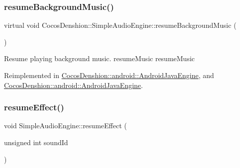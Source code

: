 \mbox{\label{classCocosDenshion_1_1SimpleAudioEngine_a0be1b6e565d0812fddd6a0ab23fadd60}} 
\subsubsection{\texorpdfstring{resume\+Background\+Music()}{resumeBackgroundMusic()}\hspace{0.1cm}{\footnotesize\ttfamily [2/2]}}
{\footnotesize\ttfamily virtual void Cocos\+Denshion\+::\+Simple\+Audio\+Engine\+::resume\+Background\+Music (\begin{DoxyParamCaption}{ }\end{DoxyParamCaption})\hspace{0.3cm}{\ttfamily [virtual]}}

Resume playing background music.  resume\+Music  resume\+Music 

Reimplemented in \hyperlink{classCocosDenshion_1_1android_1_1AndroidJavaEngine_aa0bd22b0d6bafc1c6db7c57da0688d80}{Cocos\+Denshion\+::android\+::\+Android\+Java\+Engine}, and \hyperlink{classCocosDenshion_1_1android_1_1AndroidJavaEngine_aad61da9bf83bd3f16fbef06cbbb04b38}{Cocos\+Denshion\+::android\+::\+Android\+Java\+Engine}.

\mbox{\label{classCocosDenshion_1_1SimpleAudioEngine_a326bb76e2cc33a22629ac794345e7b18}} 
\subsubsection{\texorpdfstring{resume\+Effect()}{resumeEffect()}\hspace{0.1cm}{\footnotesize\ttfamily [1/2]}}
{\footnotesize\ttfamily void Simple\+Audio\+Engine\+::resume\+Effect (\begin{DoxyParamCaption}\item[{unsigned int}]{sound\+Id }\end{DoxyParamCaption})\hspace{0.3cm}{\ttfamily [virtual]}}

